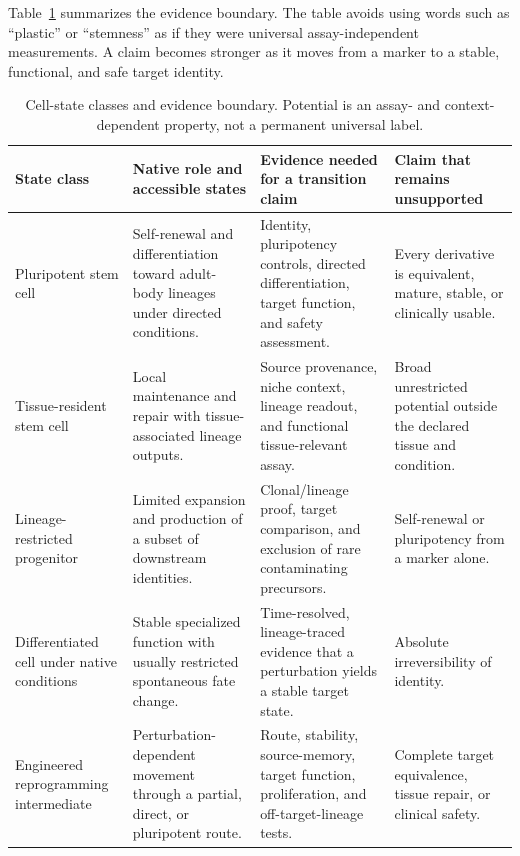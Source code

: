 \documentclass[10pt,conference]{IEEEtran}
\begin{document}
Table~\ref{tab:potency-boundary} summarizes the evidence boundary. The table avoids using words such as ``plastic'' or ``stemness'' as if they were universal assay-independent measurements. A claim becomes stronger as it moves from a marker to a stable, functional, and safe target identity.

\begin{table}[!t]
\caption{Cell-state classes and evidence boundary. Potential is an assay- and context-dependent property, not a permanent universal label.}
\label{tab:potency-boundary}
\centering
\footnotesize
\begin{tabular}{@{}p{}p{}p{}p{}@{}}
\toprule
State class & Native role and accessible states & Evidence needed for a transition claim & Claim that remains unsupported \\
\midrule
Pluripotent stem cell & Self-renewal and differentiation toward adult-body lineages under directed conditions. & Identity, pluripotency controls, directed differentiation, target function, and safety assessment. & Every derivative is equivalent, mature, stable, or clinically usable. \\
Tissue-resident stem cell & Local maintenance and repair with tissue-associated lineage outputs. & Source provenance, niche context, lineage readout, and functional tissue-relevant assay. & Broad unrestricted potential outside the declared tissue and condition. \\
Lineage-restricted progenitor & Limited expansion and production of a subset of downstream identities. & Clonal/lineage proof, target comparison, and exclusion of rare contaminating precursors. & Self-renewal or pluripotency from a marker alone. \\
Differentiated cell under native conditions & Stable specialized function with usually restricted spontaneous fate change. & Time-resolved, lineage-traced evidence that a perturbation yields a stable target state. & Absolute irreversibility of identity. \\
Engineered reprogramming intermediate & Perturbation-dependent movement through a partial, direct, or pluripotent route. & Route, stability, source-memory, target function, proliferation, and off-target-lineage tests. & Complete target equivalence, tissue repair, or clinical safety. \\
\bottomrule
\end{tabular}
\end{table}
\end{document}
